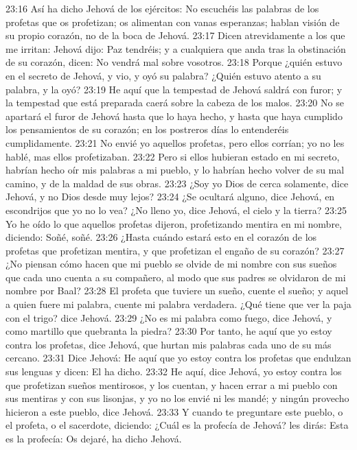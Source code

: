 23:16 Así ha dicho Jehová de los ejércitos: No escuchéis las palabras de los profetas que os profetizan; os alimentan con vanas esperanzas; hablan visión de su propio corazón, no de la boca de Jehová.  
23:17 Dicen atrevidamente a los que me irritan: Jehová dijo: Paz tendréis; y a cualquiera que anda tras la obstinación de su corazón, dicen: No vendrá mal sobre vosotros.  
23:18 Porque ¿quién estuvo en el secreto de Jehová, y vio, y oyó su palabra? ¿Quién estuvo atento a su palabra, y la oyó?  
23:19 He aquí que la tempestad de Jehová saldrá con furor; y la tempestad que está preparada caerá sobre la cabeza de los malos.  
23:20 No se apartará el furor de Jehová hasta que lo haya hecho, y hasta que haya cumplido los pensamientos de su corazón; en los postreros días lo entenderéis cumplidamente.  
23:21 No envié yo aquellos profetas, pero ellos corrían; yo no les hablé, mas ellos profetizaban.  
23:22 Pero si ellos hubieran estado en mi secreto, habrían hecho oír mis palabras a mi pueblo, y lo habrían hecho volver de su mal camino, y de la maldad de sus obras.  
23:23 ¿Soy yo Dios de cerca solamente, dice Jehová, y no Dios desde muy lejos?  
23:24 ¿Se ocultará alguno, dice Jehová, en escondrijos que yo no lo vea? ¿No lleno yo, dice Jehová, el cielo y la tierra?  
23:25 Yo he oído lo que aquellos profetas dijeron, profetizando mentira en mi nombre, diciendo: Soñé, soñé.  
23:26 ¿Hasta cuándo estará esto en el corazón de los profetas que profetizan mentira, y que profetizan el engaño de su corazón?  
23:27 ¿No piensan cómo hacen que mi pueblo se olvide de mi nombre con sus sueños que cada uno cuenta a su compañero, al modo que sus padres se olvidaron de mi nombre por Baal?  
23:28 El profeta que tuviere un sueño, cuente el sueño; y aquel a quien fuere mi palabra, cuente mi palabra verdadera. ¿Qué tiene que ver la paja con el trigo? dice Jehová.  
23:29 ¿No es mi palabra como fuego, dice Jehová, y como martillo que quebranta la piedra?  
23:30 Por tanto, he aquí que yo estoy contra los profetas, dice Jehová, que hurtan mis palabras cada uno de su más cercano.  
23:31 Dice Jehová: He aquí que yo estoy contra los profetas que endulzan sus lenguas y dicen: El ha dicho.  
23:32  He aquí, dice Jehová, yo estoy contra los que profetizan sueños mentirosos, y los cuentan, y hacen errar a mi pueblo con sus mentiras y con sus lisonjas, y yo no los envié ni les mandé; y ningún provecho hicieron a este pueblo, dice Jehová.  
23:33 Y cuando te preguntare este pueblo, o el profeta, o el sacerdote, diciendo: ¿Cuál es la profecía de Jehová? les dirás: Esta es la profecía: Os dejaré, ha dicho Jehová.  
